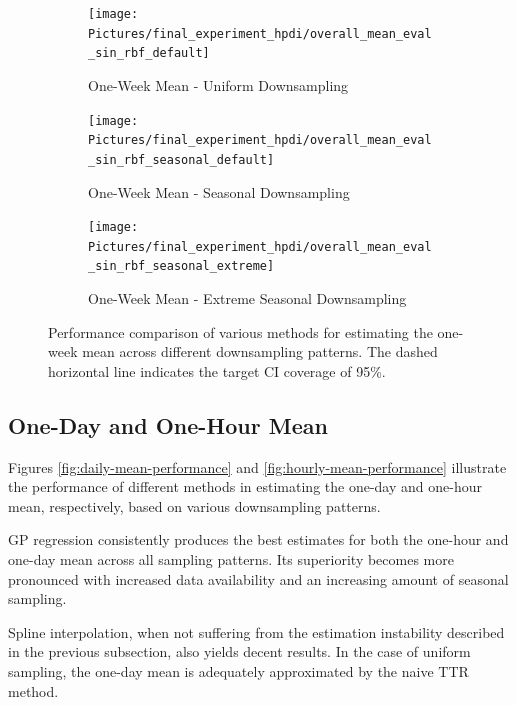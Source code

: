 \begin{figure}[!htb]
\centering
\begin{subfigure}{\textwidth}
    \centering
    \texttt{[image: Pictures/final\_experiment\_hpdi/overall\_mean\_eval\_sin\_rbf\_default]}
    \caption{One-Week Mean - Uniform Downsampling}
    \label{fig:weekly-mean-uniform-sampling-performance}
\end{subfigure}

\bigskip

\begin{subfigure}{\textwidth}
    \centering
    \texttt{[image: Pictures/final\_experiment\_hpdi/overall\_mean\_eval\_sin\_rbf\_seasonal\_default]}
    \caption{One-Week Mean - Seasonal Downsampling}
    \label{fig:weekly-mean-seasonal-sampling-performance}
\end{subfigure}

\bigskip

\begin{subfigure}{\textwidth}
    \centering
    \texttt{[image: Pictures/final\_experiment\_hpdi/overall\_mean\_eval\_sin\_rbf\_seasonal\_extreme]}
    \caption{One-Week Mean - Extreme Seasonal Downsampling}
    \label{fig:weekly-mean-extreme-seasonal-sampling-performance}
\end{subfigure}

\caption[One-Week Mean Performance]{
    Performance comparison of various methods for
estimating the one-week mean across different downsampling patterns.
    The dashed horizontal line indicates the target CI coverage of 95\%.
}
\label{fig:weekly-mean-performance}
\end{figure}



\subsection{One-Day and One-Hour Mean}

Figures \ref{fig:daily-mean-performance} and \ref{fig:hourly-mean-performance}
illustrate the performance of different methods in estimating the one-day and one-hour mean,
respectively, based on various downsampling patterns.

GP regression consistently produces the best estimates for both the one-hour and
one-day mean across all sampling patterns.
Its superiority becomes more pronounced with increased data availability and
an increasing amount of seasonal sampling.

Spline interpolation, when not suffering from the estimation instability
described in the previous subsection, also yields decent results.
In the case of uniform sampling, the one-day mean is adequately approximated
by the naive TTR method.

